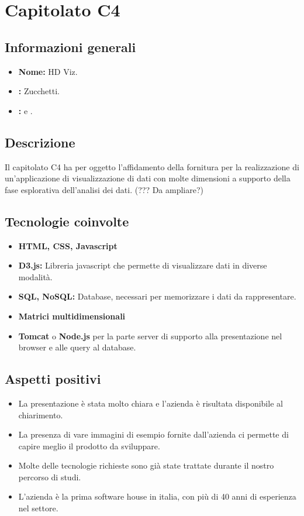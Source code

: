 \section{Capitolato C4}

\subsection{Informazioni generali}
\begin{itemize}
\item \textbf{Nome:} HD Viz.
\item \textbf{\commitProg:} Zucchetti.
\item \textbf{\proponProg:} \VT{} e \CR.
\end{itemize}

\subsection{Descrizione}
Il capitolato C4 ha per oggetto l’affidamento della fornitura per la realizzazione di un'applicazione di visualizzazione di dati con molte dimensioni a supporto della fase esplorativa dell'analisi dei dati. (??? Da ampliare?)

\subsection{Tecnologie coinvolte}
\begin{itemize}
\item \textbf{HTML, CSS, Javascript} 
\item \textbf{D3.js:} Libreria javascript che permette di visualizzare dati in diverse modalità.
\item \textbf{SQL, NoSQL:} Database, necessari per memorizzare i dati da rappresentare.
\item \textbf{Matrici multidimensionali}
\item \textbf{Tomcat} o \textbf{Node.js} per la parte server di supporto alla presentazione nel browser e alle query al database.
\end{itemize}

\subsection{Aspetti positivi}
\begin{itemize}
\item La presentazione è stata molto chiara e l’azienda è risultata disponibile al chiarimento.
\item La presenza di vare immagini di esempio fornite dall'azienda ci permette di capire meglio il prodotto da sviluppare.
\item Molte delle tecnologie richieste sono già state trattate durante il nostro percorso di studi.
\item L’azienda è la prima software house in italia, con più di 40 anni di esperienza nel settore.
\end{itemize}

